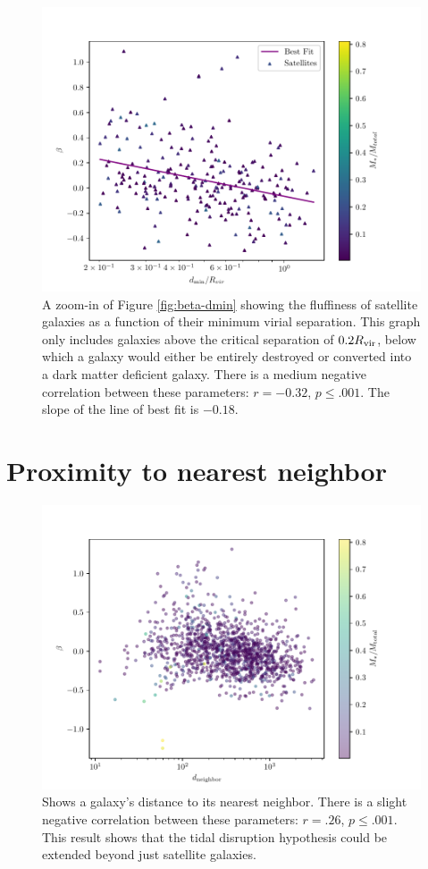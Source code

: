 \begin{figure}
    \centering
    \includegraphics*[width=\textwidth*2/3]{figs/me/beta-dmin-fit.pdf}
    \caption{A zoom-in of Figure \ref{fig:beta-dmin} showing the fluffiness of satellite galaxies as a function of their minimum virial separation. This graph only includes galaxies above the critical separation of $0.2 R_{\rm{vir}}$, below which a galaxy would either be entirely destroyed or converted into a dark matter deficient galaxy. There is a medium negative correlation between these parameters: $r=-0.32$, $p \leq .001$. The slope of the line of best fit is $-0.18$.}
    \label{fig:beta-dmin-fit}
\end{figure}


\section{Proximity to nearest neighbor}

\begin{figure}
    \centering
    \includegraphics*[width=\textwidth*2/3]{figs/me/beta-d_nearest.pdf}
    \caption{Shows a galaxy's distance to its nearest neighbor. There is a slight negative correlation between these parameters: $r = .26$, $p \leq .001$. This result shows that the tidal disruption hypothesis could be extended beyond just satellite galaxies.}
    \label{fig:beta-d_nearest}
\end{figure}


